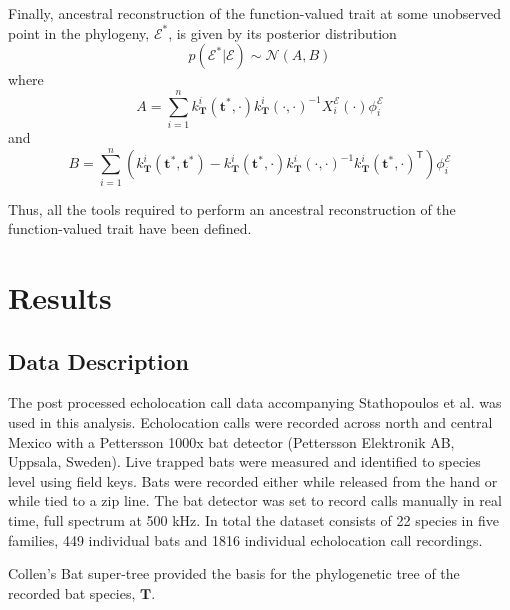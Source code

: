 \documentclass[wsdraft]{ws-rv9x6} %
\begin{document}
Finally, ancestral reconstruction of the function-valued trait at some unobserved point in the phylogeny, \(\mathcal{E}^*\), is given by its posterior distribution 
\[
p(\mathcal{E}^* | \mathcal{E})  \sim \mathcal{N}(A, B)
\]
where 
\[
A = \sum_{i=1}^{n} k_{\mathbf{T}}^i(\mathbf{t}^*, \cdot) k_{\mathbf{T}}^i(\cdot, \cdot)
^{-1} X_i^{\mathcal{E}} (\cdot) \phi_i^{\mathcal{E}}
\]
and
\[
B = \sum_{i=1}^{n}\left( k_{\mathbf{T}}^i(\mathbf{t}^*, \mathbf{t}^*) -  k_{\mathbf{T}}^i(\mathbf{t}^*, \cdot) k_{\mathbf{T}}^i(\cdot, \cdot)
^{-1} k_{\mathbf{T}}^i(\mathbf{t}^*, \cdot)^{\mathsf{T}} \right) \phi_i^{\mathcal{E}}
\]

Thus, all the tools required to perform an ancestral reconstruction of the function-valued trait have been defined. 

\section{Results}

\subsection{Data Description}

The post processed echolocation call data accompanying Stathopoulos et al. \cite{stathopoulos2017bat} was used in this analysis. Echolocation calls were recorded across north and central Mexico with a Pettersson 1000x bat detector (Pettersson Elektronik AB, Uppsala, Sweden). Live trapped bats were measured and identified to species level using field keys.\cite{ceballos2005mamiferos} \cite{medellin2sanchez} Bats were recorded either while released from the hand or while tied to a zip line. The bat detector was set to record calls manually in real time, full spectrum at 500 kHz. 
In total the dataset consists of 22 species in five families, 449 individual bats and 1816 individual echolocation call recordings.

Collen's \cite{collen2012evolution} Bat super-tree provided the basis for the phylogenetic tree of the recorded bat species, \(\mathbf{T}\). 
\end{document}
